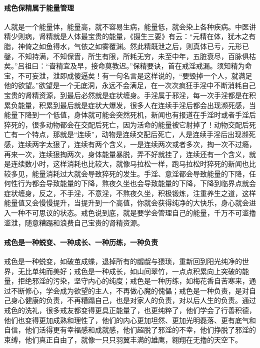 \paragraph{戒色保精属于能量管理}

人就是一个能量体，能量高，就不容易生病，能量低，就会染上各种疾病。中医讲精少则病，肾精就是人体最宝贵的能量，《摄生三要》有云：“元精在体，犹木之有脂，神倚之如鱼得水，气依之如雾覆渊。然此精既泄之后，则真体已亏，元形已鏧，不知持满，不知保啬，所生有限，所耗无穷，未至中年，五脏衰尽，百脉俱枯矣。”吕祖曰：“啬精宜及早，接命莫教迟。”保精要诀，首在戒淫戒漏。须知精为命宝，不可妄泄，泄即成傻逼矣！有一句名言是这样说的，“要毁掉一个人，就满足他的欲望。”欲望是一个无底洞，永远不会满足，在一次次疯狂手淫中不断消耗自己宝贵的肾精资源，到最后必然就是症状缠身。手淫属于邪淫，每一次手淫都是在积累负能量，积累到最后就是症状大爆发，很多人在连续手淫后都会出现濒死感，当能量下降到一个低值，身体就可能会突然死机，新闻也有报道在手淫时或者手淫后猝死的，很多动物都会在交配后死亡，因为活命的能量被它射掉了！动物交配后死亡有一个特点，那就是“连续”，动物是连续交配后死亡，人是连续手淫后出现濒死感，连续两字太狠了，连续有两个含义，一是连续两次或者多次，掏一次不过瘾，再来一次，连续狠掏两次，身体能量暴脱，弄不好就挂了，连续还有一个含义，就是连续数小时，这样消耗也比较大，就像马拉松一样，跑马拉松时猝死的新闻也比较多见，能量消耗过大就会导致猝死的发生。手淫、意淫都会导致能量的下降，任何性行为都会导致能量的下降，熬夜久坐也会导致能量的下降，下降到临界点就会症状缠身，反之，不手淫，不意淫，不熬夜久坐，积极锻炼，注重养生之道，这样能量值又会慢慢提升，当提升到一个高值，你就会获得纯净的大快乐，身心就会进入一种不可思议的状态。戒色说到底，就是要学会管理自己的能量，千万不可滥撸滥泄，随意糟蹋和浪费自己宝贵的肾精资源。

\paragraph{戒色是一种蜕变、一种成长、一种历练，一种负责}

戒色是一种蜕变，如破茧成蝶，退掉所有的龌龊与猥琐，重新回到阳光纯净的世界，无比单纯而美好；戒色是一种成长，如山间翠竹，一点点积累向上突破的能量，拒绝邪淫的污染，坚守内心的纯度；戒色是一种历练，如梅花香自苦寒来，通过不断修心，学会成为欲望的主人，不再做心魔的傀儡；戒色是一种负责，是对自己身心健康的负责，不再糟蹋自己，也是对家人的负责，对以后人生的负责。通过戒色的洗礼，很多戒友都变得更具正能量了，也更纯粹了，他们学会了行善积德，他们也变得更加成熟和理性了，他们的内心更加坦然、更加光明磊落、更有底气和自信，他们活得更有幸福感和成就感，他们超脱了邪淫的不幸，他们挣脱了邪淫的束缚，他们真正自由了，就像一只只羽翼丰满的雄鹰，翱翔在无撸的天空下。

